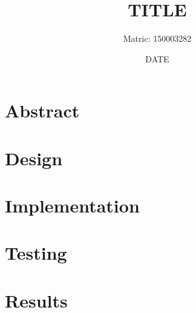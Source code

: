 \documentclass[a4paper,11pt]{article}
\title{TITLE}
\author{Matric: 150003282}
\date{DATE}
\begin{document}
\maketitle
\section{Abstract}
\pagebreak
\section{Design}
\section{Implementation}
	
\section{Testing}

\section{Results}

\pagebreak
\begin{thebibliography}{9}
	
	
	
	
	
\end{thebibliography}
\end{document}
